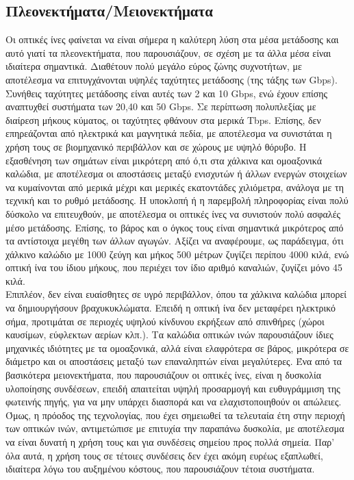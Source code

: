 \documentclass[a4paper,11pt,titlepage]{article}
\begin{document}
\newpage
\subsection{Πλεονεκτήματα/Μειονεκτήματα}

Οι οπτικές ίνες φαίνεται να είναι σήμερα η καλύτερη λύση στα μέσα μετάδοσης και αυτό γιατί τα πλεονεκτήματα, που παρουσιάζουν, σε σχέση με τα άλλα μέσα είναι ιδιαίτερα σημαντικά. Διαθέτουν πολύ μεγάλο εύρος ζώνης συχνοτήτων, με αποτέλεσμα να επιτυγχάνονται υψηλές ταχύτητες μετάδοσης (της τάξης των Gbps). Συνήθεις ταχύτητες μετάδοσης είναι αυτές των 2 και 10 Gbps, ενώ έχουν επίσης αναπτυχθεί συστήματα των 20,40 και 50 Gbps. Σε περίπτωση πολυπλεξίας με διαίρεση μήκους κύματος, οι ταχύτητες φθάνουν στα μερικά Tbps. Επίσης, δεν επηρεάζονται από ηλεκτρικά και μαγνητικά πεδία, με αποτέλεσμα να συνιστάται η χρήση τους σε βιομηχανικό περιβάλλον και σε χώρους με υψηλό θόρυβο. Η εξασθένηση των σημάτων είναι μικρότερη από ό,τι στα χάλκινα και ομοαξονικά καλώδια, με αποτέλεσμα οι αποστάσεις μεταξύ ενισχυτών ή άλλων ενεργών στοιχείων να κυμαίνονται από μερικά μέχρι και μερικές εκατοντάδες χιλιόμετρα, ανάλογα με τη τεχνική και το ρυθμό μετάδοσης. Η υποκλοπή ή η παρεμβολή πληροφορίας είναι πολύ δύσκολο να επιτευχθούν, με αποτέλεσμα οι οπτικές ίνες να συνιστούν πολύ ασφαλές μέσο μετάδοσης.
Επίσης, το βάρος και ο όγκος τους είναι σημαντικά μικρότερος από τα αντίστοιχα μεγέθη των άλλων αγωγών. Αξίζει να αναφέρουμε, ως παράδειγμα, ότι χάλκινο καλώδιο με 1000 ζεύγη και μήκος 500 μέτρων ζυγίζει περίπου 4000 κιλά, ενώ οπτική ίνα του ίδιου μήκους, που περιέχει τον ίδιο αριθμό καναλιών, ζυγίζει μόνο 45 κιλά.
\\
Επιπλέον, δεν είναι ευαίσθητες σε υγρό περιβάλλον, όπου τα χάλκινα καλώδια μπορεί να δημιουργήσουν βραχυκυκλώματα. Επειδή η οπτική ίνα δεν μεταφέρει ηλεκτρικό σήμα, προτιμάται σε περιοχές υψηλού κίνδυνου εκρήξεων από σπινθήρες (χώροι καυσίμων, εύφλεκτων αερίων κλπ.). Τα καλώδια οπτικών ινών παρουσιάζουν ίδιες μηχανικές ιδιότητες με τα ομοαξονικά, αλλά είναι ελαφρότερα σε βάρος, μικρότερα σε διάμετρο και οι αποστάσεις μεταξύ των επαναληπτών είναι μεγαλύτερες.
Ένα από τα βασικότερα μειονεκτήματα, που παρουσιάζουν οι οπτικές ίνες, είναι η δυσκολία υλοποίησης συνδέσεων, επειδή απαιτείται υψηλή προσαρμογή και ευθυγράμμιση της φωτεινής πηγής, για να μην υπάρχει διασπορά και να ελαχιστοποιηθούν οι απώλειες.
Όμως, η πρόοδος της τεχνολογίας, που έχει σημειωθεί τα τελευταία έτη στην περιοχή των οπτικών ινών, αντιμετώπισε με επιτυχία την παραπάνω δυσκολία, με αποτέλεσμα να είναι δυνατή η χρήση τους και για συνδέσεις σημείου προς πολλά σημεία. Παρ' όλα αυτά, η χρήση τους σε τέτοιες συνδέσεις δεν έχει ακόμη ευρέως εξαπλωθεί, ιδιαίτερα λόγω του αυξημένου κόστους, που παρουσιάζουν τέτοια συστήματα. 
\end{document}
